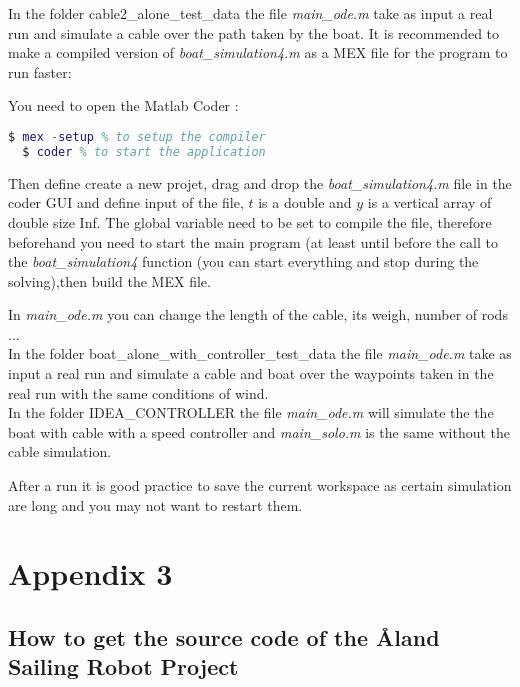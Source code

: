\documentclass[twoside,12pt]{report} %
\begin{document}
In the folder cable2\_alone\_test\_data the file \textit{main\_ode.m}  take as input a real run and simulate
a cable over the path taken by the boat. It is recommended to make a compiled version of \textit{boat\_simulation4.m} as a MEX file for the program to run faster:

You need to open the Matlab Coder :
\begin{lstlisting}[language=matlab]
  $ mex -setup % to setup the compiler
  $ coder % to start the application
\end{lstlisting}

Then define create a new projet, drag and drop the \textit{boat\_simulation4.m} file in the coder GUI and define input of the file, $t$ is a double and $y$ is a vertical array of double size Inf. The global variable need to be set to compile the file, therefore beforehand you need to start the main program (at least until before the call to the   \textit{boat\_simulation4} function (you can start everything and stop during the solving),then build the MEX file.

In \textit{main\_ode.m} you can change the length of the cable, its weigh, number of rods ... \\


In the folder boat\_alone\_with\_controller\_test\_data the file \textit{main\_ode.m}  take as input a real run and simulate
a cable and boat over the waypoints taken in the real run with the same conditions of wind. \\


In the folder IDEA\_CONTROLLER the file \textit{main\_ode.m}  will simulate the the boat with cable with a speed controller and \textit{main\_solo.m} is the same without the cable simulation.

After a run it is good practice to save the current workspace as certain simulation are long and you may not want to restart them.






\chapter*{Appendix 3}

\section*{How to get the source code of the \r{A}land Sailing Robot Project}
\end{document}
